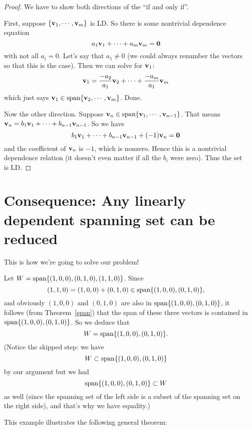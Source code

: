 
\begin{proof}
We have to show both directions of the ``if and only if''.

First, suppose $\{\mathbf{v}_1, \cdots, \mathbf{v}_m\}$ is LD.  So there is
some nontrivial dependence equation
$$
a_1\mathbf{v}_1 + \cdots + a_m\mathbf{v}_m = \mathbf{0}
$$
with not all $a_i = 0$.  Let's say that $a_1 \neq 0$ (we could always
renumber the vectors so that this is the case).  Then we can solve for
$\mathbf{v}_1$:
$$
\mathbf{v}_1 = \frac{-a_2}{a_1}\mathbf{v}_2 + \cdots + \frac{-a_m}{a_1}\mathbf{v}_m
$$
which just says $\mathbf{v}_1 \in \textrm{span}\{ \mathbf{v}_2, \cdots, \mathbf{v}_m\}$.  Done.

Now the other direction.  Suppose $\mathbf{v}_n \in \textrm{span}\{ \mathbf{v}_1, \cdots, \mathbf{v}_{n-1}\}$.
That means $\mathbf{v}_n = b_1\mathbf{v}_1 + \cdots + b_{n-1}\mathbf{v}_{n-1}$.  So we have
$$
b_1\mathbf{v}_1 + \cdots + b_{n-1}\mathbf{v}_{n-1} + (-1)\mathbf{v}_n = \mathbf{0}
$$ 
and the coefficient of $\mathbf{v}_n$ is $-1$, which is nonzero.  Hence this
is a nontrivial dependence relation (it doesn't even matter if all
the $b_i$ were zero).  Thus the set is LD.
\end{proof}




\section{Consequence:  Any linearly dependent spanning set can be reduced}

This is how we're going to solve our problem!  

\begin{myexample} Let $W = \textrm{span}\{ (1,0,0), (0,1,0), (1,1,0)\}$.  Since 
$$(1,1,0) = (1,0,0)+(0,1,0) \in \textrm{span}\{(1,0,0), (0,1,0)\},$$
and obviously $(1,0,0)$ and $(0,1,0)$ are also in $\textrm{span}\{(1,0,0), (0,1,0)\}$,
it follows (from Theorem~\ref{span}) 
that the span of these three vectors is contained in $\textrm{span}\{(1,0,0), (0,1,0)\}$.
So we deduce that
$$
W = \textrm{span}\{(1,0,0), (0,1,0)\}.
$$
(Notice the skipped step:  we have $$W \subset \textrm{span}\{(1,0,0), (0,1,0)\}$$
by our argument but we had $$\textrm{span}\{(1,0,0), (0,1,0)\} \subset W$$ as well
(since the spanning set of the left side is a subset of the spanning 
set on the right side),
and that's why we have equality.) \end{myexample}

This example illustrates the following general theorem:

